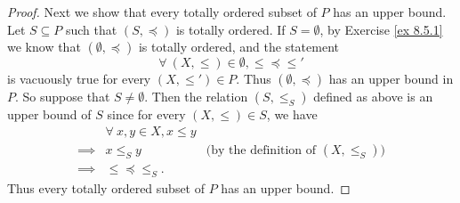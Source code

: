 \begin{proof}
    Next we show that every totally ordered subset of \(P\) has an upper bound.
    Let \(S \subseteq P\) such that \((S, \preceq)\) is totally ordered.
    If \(S = \emptyset\), by Exercise \ref{ex 8.5.1} we know that \((\emptyset, \preceq)\) is totally ordered, and the statement
    \[
        \forall\ (X, \leq) \in \emptyset, \leq \preceq \leq'
    \]
    is vacuously true for every \((X, \leq') \in P\).
    Thus \((\emptyset, \preceq)\) has an upper bound in \(P\).
    So suppose that \(S \neq \emptyset\).
    Then the relation \((S, \leq_S)\) defined as above is an upper bound of \(S\) since for every \((X, \leq) \in S\), we have
    \begin{align*}
                 & \forall\ x, y \in X, x \leq y                                                 \\
        \implies & x \leq_S y                    & \text{(by the definition of \((X, \leq_S)\))} \\
        \implies & \leq \preceq \leq_S.
    \end{align*}
    Thus every totally ordered subset of \(P\) has an upper bound.


\end{proof}
